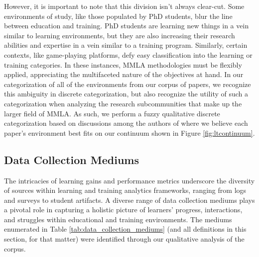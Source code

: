 \documentclass[manuscript,screen,review]{acmart}
\begin{document}
However, it is important to note that this division isn't always clear-cut. Some environments of study, like those populated by PhD students, blur the line between education and training. PhD students are learning new things in a vein similar to learning environments, but they are also increasing their research abilities and expertise in a vein similar to a training program. Similarly, certain contexts, like game-playing platforms, defy easy classification into the learning or training categories. In these instances, MMLA methodologies must be flexibly applied, appreciating the multifaceted nature of the objectives at hand. In our categorization of all of the environments from our corpus of papers, we recognize this ambiguity in discrete categorization, but also recognize the utility of such a categorization when analyzing the research subcommunities that make up the larger field of MMLA. As such, we perform a fuzzy qualitative discrete categorization based on discussions among the authors of where we believe each paper’s environment best fits on our continuum shown in Figure \ref{fig:ltcontinuum}.

\subsection{Data Collection Mediums} \label{subsec:data_collection_mediums}

The intricacies of learning gains and performance metrics underscore the diversity of sources within learning and training analytics frameworks, ranging from logs and surveys to student artifacts. A diverse range of data collection mediums plays a pivotal role in capturing a holistic picture of learners' progress, interactions, and struggles within educational and training environments. The mediums enumerated in Table \ref{tab:data_collection_mediums} (and all definitions in this section, for that matter) were identified through our qualitative analysis of the corpus.
\end{document}
